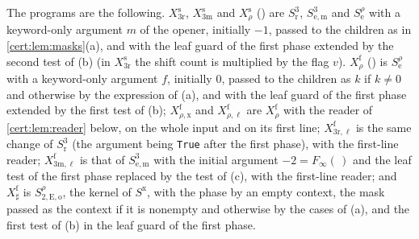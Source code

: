 The programs are the following. $X^{\mathrm s}_{3\mathrm r}$, $X^{\mathrm s}_{3\mathrm m}$
and $X^{\mathrm s}_{\rho}$ () are $S^{3}_{\mathrm r}$,
$S^{3}_{\mathrm{e,m}}$ and $S^{\rho}_{\mathrm e}$ with a keyword-only argument $m$ of the
opener, initially $-1$, passed to the children as in \cref{cert:lem:masks}(a), and with the
leaf guard of the first phase extended by the second test of (b) (in
$X^{\mathrm s}_{3\mathrm r}$ the shift count is multiplied by the flag $v$).
$X^{\mathrm f}_{\rho}$ () is $S^{\rho}_{\mathrm e}$ with a keyword-only
argument $f$, initially $0$, passed to the children as $k$ if $k\neq 0$ and otherwise by
the expression of (a), and with the leaf guard of the first phase extended by the first
test of (b); $X^{\mathrm f}_{\rho,\mathrm x}$ and $X^{\mathrm f}_{\rho,\ell}$ are
$X^{\mathrm f}_{\rho}$ with the reader of \cref{cert:lem:reader} below, on the whole input
and on its first line; $X^{\mathrm f}_{3\mathrm r,\ell}$ is the same change of
$S^{3}_{\mathrm r}$ (the argument being \texttt{True} after the first phase), with the
first-line reader; $X^{\mathrm f}_{3\mathrm m,\ell}$ is that of $S^{3}_{\mathrm{e,m}}$ with
the initial argument $-2=F_{\infty}(\,)$ and the leaf test of the first phase replaced by
the test of (c), with the first-line reader; and $X^{\mathrm f}_{\sharp}$ is
$S^{\rho}_{2,\mathrm{E,o}}$, the kernel of $S^{\mathrm x}$, with the phase by an empty
context, the mask passed as the context if it is nonempty and otherwise by the cases of
(a), and the first test of (b) in the leaf guard of the first phase.

